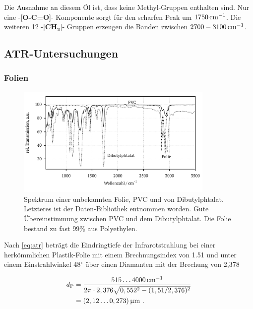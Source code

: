 \documentclass[a4paper,10pt,twocolumn]{article}
\newcommand{\ix}[1]{_\text{#1}}
\newcommand{\fett}[1]{\textbf{#1}}
\begin{document}
		Die Ausnahme an diesem \"Ol ist, dass keine Methyl-Gruppen enthalten sind. Nur eine -[\fett{O-C=O}]- Komponente sorgt f\"ur den scharfen Peak um $\unit[1750]{cm^{-1}}$. Die weiteren 12 -[\fett{CH}$_{\fett{2}}$]- Gruppen erzeugen die Banden zwischen $\unit[2700-3100]{cm^{-1}}$.
		
		\subsection{ATR-Untersuchungen}
		
		\subsubsection{Folien}

			\begin{figure}
			\centering
				\includegraphics[width=0.85\textwidth]{Gruppe2A/folien.pdf}
				\caption{Spektrum einer unbekannten Folie, PVC und von Dibutylphtalat. Letzteres ist der Daten-Bibliothek entnommen worden. Gute \"Ubereinstimmung zwischen PVC und dem Dibutylphtalat. Die Folie bestand zu fast 99\% aus Polyethylen.} 
				\label{img:folien}
			\end{figure}
			
		Nach \autoref{eq:atr} betr\"agt die Eindringtiefe der Infrarotstrahlung bei einer herk\"ommlichen Plastik-Folie mit einem Brechnungsindex von 1.51 und unter einem Einstrahlwinkel 48$^{\circ}$ \"uber einen Diamanten mit der Brechung von 2,378 
		
		\begin{align}
			d\ix{P}&=\frac{\unit[515\dots4000]{cm^{-1}}}{2\pi\cdot2,376\sqrt{0,552^{2}-(1,51/2,376)^{2}}} \nonumber \\
			&=\unit[(2,12\dots0,273)]{\upmu m}\,\, .\nonumber
		\end{align}
		
\end{document}
